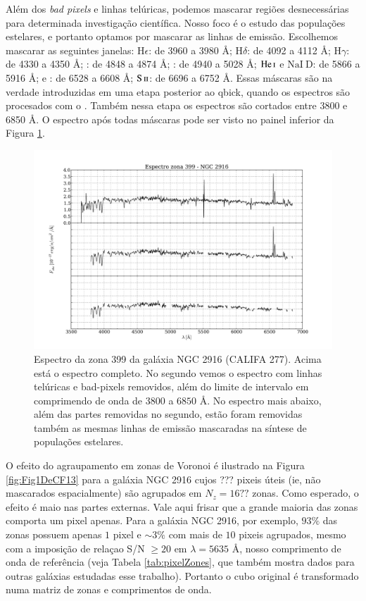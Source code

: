 Além dos {\em bad pixels} e linhas telúricas, podemos mascarar regiões desnecessárias para determinada investigação
científica. Nosso foco é o estudo das populações estelares, e portanto optamos por mascarar as linhas de emissão.
Escolhemos mascarar as seguintes janelas: $\mathrm{H}\epsilon$: de 3960 a 3980 \AA; $\mathrm{H}\delta$: de 4092 a 4112
\AA; $\mathrm{H}\gamma$: de 4330 a 4350 \AA; \Hbeta: de 4848 a 4874 \AA; \oIII: de 4940 a 5028 \AA;
$\mathrm{He\,\textsc{i}}$ e $\mathrm{NaI\ D}$: de 5866 a 5916 \AA; \Halpha e \nII: de 6528 a 6608 \AA;
$\mathrm{S\,\textsc{ii}}$: de 6696 a 6752 \AA. Essas máscaras são na verdade introduzidas em uma etapa posterior ao
{\sc qbick}, quando os espectros são procesados com o \starlight. Também nessa etapa os espectros são cortados entre
3800 e 6850 \AA. O espectro após todas máscaras pode ser visto no painel inferior da Figura \ref{fig:checkmask}.

\begin{figure}
    \includegraphics[width=1.0\textwidth]{figuras/K0277-constant_inital_mask-399.pdf}
    \caption[Exemplo de máscaras em um espectro do cubo de dados.]
    {Espectro da zona 399 da galáxia NGC 2916 (CALIFA 277). Acima está o espectro completo. No segundo vemos o espectro
    com linhas telúricas e bad-pixels removidos, além do limite de intervalo em comprimendo de onda de $3800$ a $6850$
    \AA. No espectro mais abaixo, além das partes removidas no segundo, estão foram removidas também as mesmas linhas de
    emissão mascaradas na síntese de populações estelares.}
    \label{fig:checkmask}
\end{figure}

O efeito do agraupamento em zonas de Voronoi é ilustrado na Figura \ref{fig:Fig1DeCF13} para a galáxia NGC 2916 cujos
??? pixeis úteis (ie, não mascarados espacialmente) são agrupados em $N_z = 16??$ zonas. Como esperado, o efeito é maio
nas partes externas. Vale aqui frisar que a grande maioria das zonas comporta um pixel apenas. Para a galáxia NGC 2916,
por exemplo, $93\%$ das zonas possuem apenas $1$ pixel e $\sim 3\%$ com mais de $10$ pixeis agrupados, mesmo com a
imposição de relaçao S/N $\ge 20$ em $\lambda = 5635$ \AA, nosso comprimento de onda de referência (veja Tabela
\ref{tab:pixelZones}, que também mostra dados para outras galáxias estudadas esse trabalho). Portanto o cubo original é
transformado numa matriz de zonas e comprimentos de onda.

